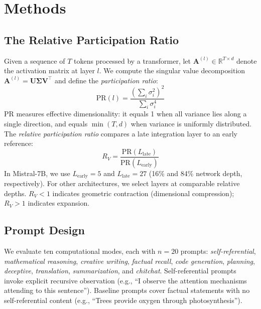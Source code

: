 \documentclass{article}
\newcommand{\RV}{R_V}
\newcommand{\PR}{\text{PR}}
\begin{document}
\section{Methods}

\subsection{The Relative Participation Ratio}

Given a sequence of $T$ tokens processed by a transformer, let $\mathbf{A}^{(l)} \in \mathbb{R}^{T \times d}$ denote the activation matrix at layer $l$.
We compute the singular value decomposition $\mathbf{A}^{(l)} = \mathbf{U} \boldsymbol{\Sigma} \mathbf{V}^\top$ and define the \emph{participation ratio}:
\begin{equation}
    \PR(l) = \frac{\left(\sum_i \sigma_i^2\right)^2}{\sum_i \sigma_i^4}
    \label{eq:pr}
\end{equation}
PR measures effective dimensionality: it equals 1 when all variance lies along a single direction, and equals $\min(T, d)$ when variance is uniformly distributed.
The \emph{relative participation ratio} compares a late integration layer to an early reference:
\begin{equation}
    \RV = \frac{\PR(L_\text{late})}{\PR(L_\text{early})}
    \label{eq:rv}
\end{equation}
In Mistral-7B, we use $L_\text{early}{=}5$ and $L_\text{late}{=}27$ (16\% and 84\% network depth, respectively).
For other architectures, we select layers at comparable relative depths.
$\RV < 1$ indicates geometric contraction (dimensional compression); $\RV > 1$ indicates expansion.

\subsection{Prompt Design}

We evaluate ten computational modes, each with $n{=}20$ prompts: \emph{self-referential}, \emph{mathematical reasoning}, \emph{creative writing}, \emph{factual recall}, \emph{code generation}, \emph{planning}, \emph{deceptive}, \emph{translation}, \emph{summarization}, and \emph{chitchat}.
Self-referential prompts invoke explicit recursive observation (e.g., ``I observe the attention mechanisms attending to this sentence'').
Baseline prompts cover factual statements with no self-referential content (e.g., ``Trees provide oxygen through photosynthesis'').
\end{document}
